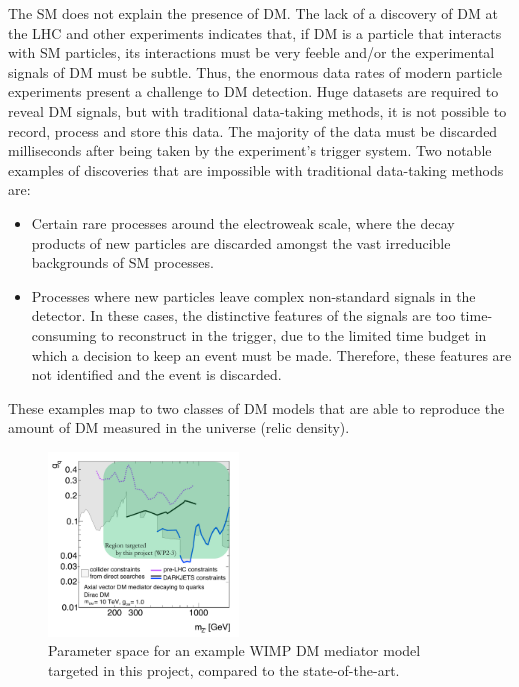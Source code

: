 \documentclass[11pt,a4paper]{article}
\begin{document}
The SM does not explain the presence of DM. 
The lack of a discovery of DM at the LHC and other experiments indicates that, if DM is a particle that interacts with SM particles, its interactions must be very feeble and/or the experimental signals of DM must be subtle. 
Thus, the enormous data rates of modern particle experiments present a challenge to DM detection. 
Huge datasets are required to reveal DM signals, but with traditional data-taking methods, it is not possible to record, process and store this data.
The majority of the data must be discarded milliseconds after being taken by the experiment's trigger system. 
Two notable examples of discoveries that are impossible with traditional data-taking methods are:
\begin{itemize} 
\item Certain rare processes around the electroweak scale, where the decay products of new particles are discarded amongst the vast irreducible backgrounds of SM processes.
\item Processes where new particles leave complex non-standard signals in the detector. 
In these cases, the distinctive features of the signals are too time-consuming to reconstruct in the trigger, due to the limited time budget in which a decision to keep an event must be made. 
Therefore, these features are not identified and the event is discarded.
\end{itemize}

These examples map to two classes of DM models that are able to reproduce the amount of DM measured in the universe (relic density). 

\begin{figure} 
\begin{center}
\includegraphics[width=0.45\textwidth]{figs/SummaryPlot.pdf}
\caption{Parameter space for an example  WIMP DM mediator model targeted in this project, compared to the state-of-the-art. \label{fig:pastFutureConstraints} }
\end{center}
\end{figure}
\end{document}

